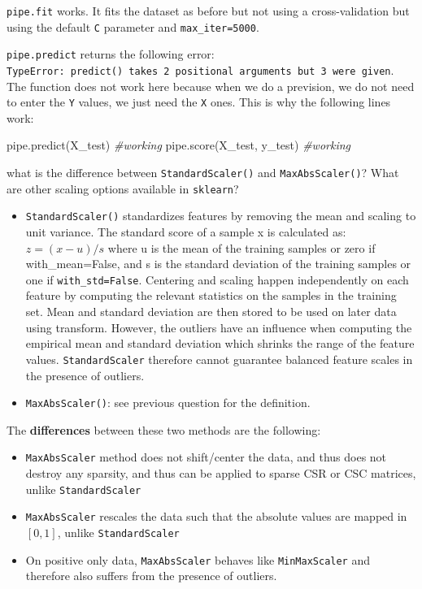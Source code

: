 \documentclass[10pt,a4paper]{article}
\newenvironment{Shaded}{\begin{snugshade}}{\end{snugshade}}
\newcommand{\CommentTok}[1]{\textcolor[rgb]{0.56,0.35,0.01}{\textit{#1}}}
\newcommand{\NormalTok}[1]{#1}
\providecommand{\tightlist}{%
  \setlength{\parskip}{0pt}
  }
\theoremstyle{break}
\begin{document}
\texttt{pipe.fit} works. It fits the dataset as before but not using a cross-validation but using the default \texttt{C} parameter and \texttt{max\_iter=5000}.

\texttt{pipe.predict} returns the following error: \texttt{TypeError:\ predict()\ takes\ 2\ positional\ arguments\ but\ 3\ were\ given}.
The function does not work here because when we do a prevision, we do not need to enter the \texttt{Y} values, we just need the \texttt{X} ones.
This is why the following lines work:

\begin{Shaded}
\begin{Highlighting}[]
\NormalTok{    pipe.predict(X_test) }\CommentTok{#working}
\NormalTok{    pipe.score(X_test, y_test)  }\CommentTok{#working}
\end{Highlighting}
\end{Shaded}

\begin{tcolorbox}

what is the difference between \texttt{StandardScaler()} and \texttt{MaxAbsScaler()}? What are other scaling options available in \texttt{sklearn}?

\end{tcolorbox}

\begin{itemize}
\item
  \texttt{StandardScaler()} standardizes features by removing the mean and scaling to unit variance. The standard score of a sample x is calculated as: \(z = (x - u) / s\) where u is the mean of the training samples or zero if with\_mean=False, and s is the standard deviation of the training samples or one if \texttt{with\_std=False}. Centering and scaling happen independently on each feature by computing the relevant statistics on the samples in the training set. Mean and standard deviation are then stored to be used on later data using transform.
  However, the outliers have an influence when computing the empirical mean and standard deviation which shrinks the range of the feature values. \texttt{StandardScaler} therefore cannot guarantee balanced feature scales in the presence of outliers.
\item
  \texttt{MaxAbsScaler()}: see previous question for the definition.
\end{itemize}

The \textbf{differences} between these two methods are the following:

\begin{itemize}
\tightlist
\item
  \texttt{MaxAbsScaler} method does not shift/center the data, and thus does not destroy any sparsity, and thus can be applied to sparse CSR or CSC matrices, unlike \texttt{StandardScaler}
\item
  \texttt{MaxAbsScaler} rescales the data such that the absolute values are mapped in \([0, 1]\), unlike \texttt{StandardScaler}
\item
  On positive only data, \texttt{MaxAbsScaler} behaves like \texttt{MinMaxScaler} and therefore also suffers from the presence of outliers.
\end{itemize}
\end{document}

